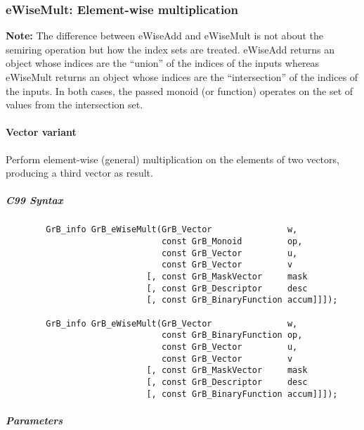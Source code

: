 \subsubsection{{\sf eWiseMult}: Element-wise multiplication}

{\bf Note:} The difference between {\sf eWiseAdd} and {\sf eWiseMult} is not 
about the semiring operation but how the index sets are treated.
{\sf eWiseAdd} returns an object whose indices are the ``union'' of the 
indices of the inputs whereas {\sf eWiseMult} returns an object whose indices 
are the ``intersection'' of the indices of the inputs. In both cases, the 
passed monoid (or function) operates on the set of values from the 
intersection set. 
 
\paragraph{Vector variant}

Perform element-wise (general) multiplication on the elements of two vectors,
producing a third vector as result.

\subparagraph{C99 Syntax}

\begin{verbatim}
        GrB_info GrB_eWiseMult(GrB_Vector               w,
                               const GrB_Monoid         op, 
                               const GrB_Vector         u,
                               const GrB_Vector         v
                            [, const GrB_MaskVector     mask
                            [, const GrB_Descriptor     desc
                            [, const GrB_BinaryFunction accum]]]);
                            
        GrB_info GrB_eWiseMult(GrB_Vector               w,
                               const GrB_BinaryFunction op, 
                               const GrB_Vector         u,
                               const GrB_Vector         v
                            [, const GrB_MaskVector     mask
                            [, const GrB_Descriptor     desc
                            [, const GrB_BinaryFunction accum]]]);
\end{verbatim}

\subparagraph{Parameters}

